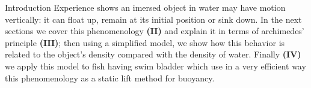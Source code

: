 \begin{section}{Introduction}
    Experience shows an imersed object in water may have motion vertically: it can float up, remain 
    at its initial position or sink down. In the next sections we cover this phenomenology 
    \textbf{(II)} and explain it in terms of archimedes' principle \textbf{(III)}; then using a 
    simplified model, we show how this behavior is related to the object's density compared with the 
    density of water. Finally \textbf{(IV)} we apply this model to fish having swim bladder which use 
    in a very efficient way this phenomenology as a static lift method for buoyancy.
\end{section}
